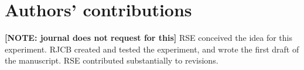 \documentclass{article}
\begin{document}
\section{Authors' contributions}

\textbf{[NOTE: journal does not request for this]}
RSE conceived the idea for this experiment. 
RJCB created and tested the experiment, 
and wrote the first draft of the manuscript. 
RSE contributed substantially to revisions.




\appendix
\end{document}
